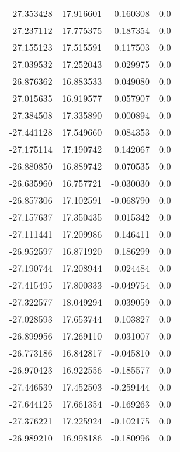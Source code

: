 \begin{tabular}{rrrr}
      -27.353428 &        17.916601 &    0.160308 &   0.0 \\
      -27.237112 &        17.775375 &    0.187354 &   0.0 \\
      -27.155123 &        17.515591 &    0.117503 &   0.0 \\
      -27.039532 &        17.252043 &    0.029975 &   0.0 \\
      -26.876362 &        16.883533 &   -0.049080 &   0.0 \\
      -27.015635 &        16.919577 &   -0.057907 &   0.0 \\
      -27.384508 &        17.335890 &   -0.000894 &   0.0 \\
      -27.441128 &        17.549660 &    0.084353 &   0.0 \\
      -27.175114 &        17.190742 &    0.142067 &   0.0 \\
      -26.880850 &        16.889742 &    0.070535 &   0.0 \\
      -26.635960 &        16.757721 &   -0.030030 &   0.0 \\
      -26.857306 &        17.102591 &   -0.068790 &   0.0 \\
      -27.157637 &        17.350435 &    0.015342 &   0.0 \\
      -27.111441 &        17.209986 &    0.146411 &   0.0 \\
      -26.952597 &        16.871920 &    0.186299 &   0.0 \\
      -27.190744 &        17.208944 &    0.024484 &   0.0 \\
      -27.415495 &        17.800333 &   -0.049754 &   0.0 \\
      -27.322577 &        18.049294 &    0.039059 &   0.0 \\
      -27.028593 &        17.653744 &    0.103827 &   0.0 \\
      -26.899956 &        17.269110 &    0.031007 &   0.0 \\
      -26.773186 &        16.842817 &   -0.045810 &   0.0 \\
      -26.970423 &        16.922556 &   -0.185577 &   0.0 \\
      -27.446539 &        17.452503 &   -0.259144 &   0.0 \\
      -27.644125 &        17.661354 &   -0.169263 &   0.0 \\
      -27.376221 &        17.225924 &   -0.102175 &   0.0 \\
      -26.989210 &        16.998186 &   -0.180996 &   0.0 \\

\end{tabular}
